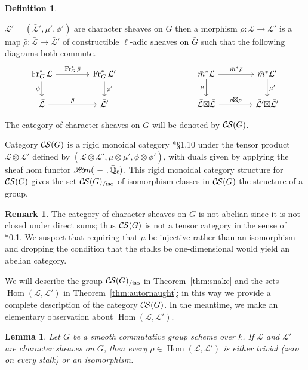 \documentclass[10pt]{amsart}
\theoremstyle{plain}
\newtheorem{lemma}[theorem]{Lemma}
\theoremstyle{definition}
\newtheorem{definition}[theorem]{Definition}
\newtheorem{remark}[theorem]{Remark}
\newcommand{\EE}{\mathbb{\bar Q}_\ell}
\newcommand{\Fq}{k}
\newcommand{\Frob}[1]{\operatorname{Fr}_{#1}}
\DeclareMathOperator{\Hom}{Hom}
\newcommand{\sheafHom}{{\mathscr{H}\hskip-4pt{\it o}\hskip-2pt{\it m}}}
\newcommand{\cs}[1]{{\mathcal{#1}}}
\newcommand{\gcs}[1]{{\mathcal{\bar #1}}}
\newcommand{\CS}{{\mathcal{C\hskip-0.8pt S}}}
\newcommand{\CSiso}[1]{\CS(#1)_{/\text{iso}}}
\newcommand{\bm}{\bar{m}}
\newcommand{\bG}{\bar{G}}
\newcommand{\brho}{{\bar\rho}}
\newcommand{\tight}[3]{\hspace{-#1pt}{#2}\hspace{-#3pt}}
\newcommand{\LxL}{\text{$\gcs{L} \tight{0}{\boxtimes}{0} \gcs{L}$}}
\begin{document}
\begin{definition}
\begin{enumerate}
  $\cs{L'} = (\gcs{L'},\mu',\phi')$ are character sheaves on $G$ then
  a morphism $\rho : \cs{L} \to \cs{L}'$ is a map $\brho : \gcs{L} \to \gcs{L'}$
  of constructible $\ell$-adic sheaves on $\bG$ such that the following diagrams both commute.
  \[
  \begin{tikzcd}[column sep=40]
  \Frob{G}^* \gcs{L} \rar{\Frob{G}^* \brho} \arrow[swap]{d}{\phi} & \Frob{G}^* \gcs{L'} \dar{\phi'}
  & & \arrow[swap]{d}{\mu} \bm^* \gcs{L} \rar{\bm^* \brho} & \bm^* \gcs{L'} \dar{\mu'} \\
  \gcs{L} \rar{\brho} & \gcs{L'}
  & {} & \LxL \rar{\tight{1}{\rho\boxtimes \rho}{1}} & \gcs{L'} \tight{0}{\boxtimes}{0} \gcs{L'}
  \end{tikzcd}
  \]
\end{enumerate}
 The category of character sheaves on $G$ will be denoted by $\CS(G)$.
 \end{definition}

Category $\CS(G)$ is a rigid monoidal category
\cite{etingof:09a}*{\S1.10} under the tensor product
$\cs{L} \otimes \cs{L'}$ defined by $(\gcs{L}\otimes\gcs{L'}, \mu\otimes\mu', \phi\otimes \phi')$,
with duals given by applying the sheaf hom functor
$\sheafHom(\ - \ ,\EE)$.
This rigid monoidal category structure for $\CS(G)$ gives the set $\CSiso{G}$
of isomorphism classes in $\CS(G)$ the structure of a group.

\begin{remark}
The category of character sheaves on $G$ is not abelian since it is not closed under direct sums; 
thus $\CS(G)$ is not a tensor category in the sense of \cite{deligne:02a}*{0.1}.  
We suspect that requiring that $\mu$ be injective rather than
an isomorphism and dropping the condition that the stalks be one-dimensional would yield an abelian category.
\end{remark}

We will describe the group $\CSiso{G}$ in Theorem~\ref{thm:snake}
and the sets $\Hom(\cs{L},\cs{L}')$ in Theorem~\ref{thm:autornaught}; in this way we provide a complete description of the category $\CS(G)$.
%
In the meantime, we make an elementary observation about $\Hom(\cs{L},\cs{L}')$.

\begin{lemma}\label{lem:autornaught}
Let $G$ be a smooth commutative group scheme over $\Fq$.
If $\cs{L}$ and $\cs{L}'$ are character sheaves on $G$, then
every $\rho\in \Hom(\cs{L},\cs{L}')$ is either trivial (zero on every stalk)
or an isomorphism. 
\end{lemma}
\end{document}
